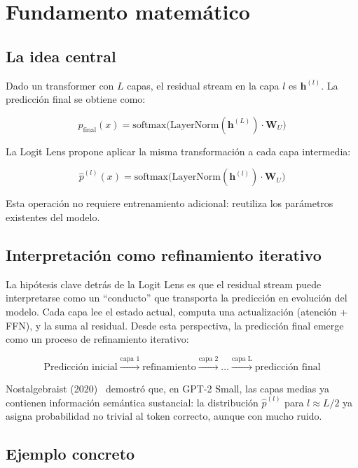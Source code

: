 \documentclass[11pt,a4paper]{report}
\theoremstyle{definition}
\begin{document}
\section{Fundamento matemático}

\subsection{La idea central}

Dado un transformer con $L$ capas, el residual stream en la capa $l$ es $\mathbf{h}^{(l)}$. La predicción final se obtiene como:

\[
p_{\text{final}}(x) = \text{softmax}\!\big(\text{LayerNorm}(\mathbf{h}^{(L)}) \cdot \mathbf{W}_U\big)
\]

La Logit Lens propone aplicar la misma transformación a cada capa intermedia:

\[
\hat{p}^{(l)}(x) = \text{softmax}\!\big(\text{LayerNorm}(\mathbf{h}^{(l)}) \cdot \mathbf{W}_U\big)
\]

Esta operación no requiere entrenamiento adicional: reutiliza los parámetros existentes del modelo.

\subsection{Interpretación como refinamiento iterativo}

La hipótesis clave detrás de la Logit Lens es que el residual stream puede interpretarse como un ``conducto'' que transporta la predicción en evolución del modelo. Cada capa lee el estado actual, computa una actualización (atención + FFN), y la suma al residual. Desde esta perspectiva, la predicción final emerge como un proceso de refinamiento iterativo:

\[
\text{Predicción inicial} \xrightarrow{\text{capa 1}} \text{refinamiento} \xrightarrow{\text{capa 2}} \dots \xrightarrow{\text{capa L}} \text{predicción final}
\]

Nostalgebraist (2020)~\cite{nostalgebraist2020logitlens} demostró que, en GPT-2 Small, las capas medias ya contienen información semántica sustancial: la distribución $\hat{p}^{(l)}$ para $l \approx L/2$ ya asigna probabilidad no trivial al token correcto, aunque con mucho ruido.

\subsection{Ejemplo concreto}
\end{document}
